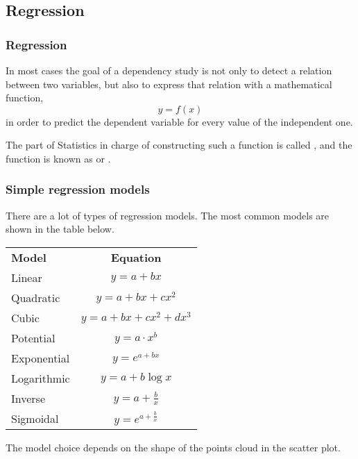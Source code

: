 \subsection{Regression}
\begin{frame}
\frametitle{Regression}
In most cases the goal of a dependency study is not only to detect a relation between two variables, but also to express
that relation with a mathematical function, 
\[y=f(x)\]
in order to predict the dependent variable for every value of the independent one.   

The part of Statistics in charge of constructing such a function is called , and the function is known as  or .
\end{frame}


\begin{frame}
\frametitle{Simple regression models}
There are a lot of types of regression models.
The most common models are shown in the table below.

\begin{center}
\begin{tabular}{lc}
\toprule
\textbf{Model} & \textbf{Equation}\\
Linear & $y=a+bx$\\
Quadratic & $y=a+bx+cx^2$\\
Cubic & $y=a+bx+cx^2+dx^3$\\
Potential & $y=a\cdot x^b$\\
Exponential & $y=e^{a+bx}$\\
Logarithmic & $y=a+b\log x$\\
Inverse & $y = a+\frac{b}{x}$\\
Sigmoidal & $y= e^{a+\frac{b}{x}}$\\
\bottomrule
\end{tabular}
\end{center}

The model choice depends on the shape of the points cloud in the scatter plot.
\end{frame}


